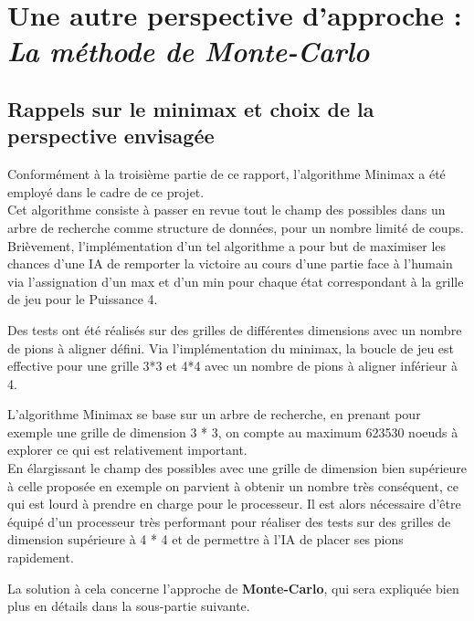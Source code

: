 \documentclass[a4paper]{article}
\begin{document}
\section{\large Une autre perspective d'approche : \textit{La méthode de Monte-Carlo}}

\subsection{Rappels sur le minimax et choix de la perspective envisagée}

\vspace{0.7cm}

Conformément à la troisième partie de ce rapport, l'algorithme Minimax a été employé dans le cadre de ce projet.
\\ Cet algorithme consiste à passer en revue tout le champ des possibles dans un arbre de recherche comme structure de données, pour un nombre limité de coups. \\ Brièvement, l'implémentation d'un tel algorithme a pour but de maximiser les chances d'une IA de remporter la victoire au cours d'une partie face à l'humain via l'assignation d'un max et d'un min pour chaque état correspondant à la grille de jeu pour le Puissance 4.

\vspace{0.3cm}

Des tests ont été réalisés sur des grilles de différentes dimensions avec un nombre de pions à aligner défini. Via l'implémentation du minimax, la boucle de jeu est effective pour une grille 3*3 et 4*4 avec un nombre de pions à aligner inférieur à 4. 

\vspace{0.4cm}

L'algorithme Minimax se base sur un arbre de recherche, en prenant pour exemple une grille de dimension 3 * 3, on compte au maximum 623530 noeuds à explorer ce qui est relativement important. \\ En élargissant le champ des possibles avec une grille de dimension bien supérieure à celle proposée en exemple on parvient à obtenir un nombre très conséquent, ce qui est lourd à prendre en charge pour le processeur. 
Il est alors nécessaire d'être équipé d'un processeur très performant pour réaliser des tests sur des grilles de dimension supérieure à 4 * 4 et de permettre à l'IA de placer ses pions rapidement.

La solution à cela concerne l'approche de \textbf{Monte-Carlo}, qui sera expliquée bien plus en détails dans la sous-partie suivante.
\end{document}
